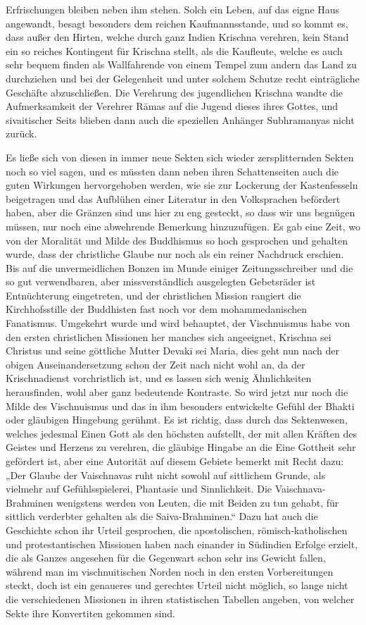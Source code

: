 \documentclass{article}
\begin{document}
Erfrischungen bleiben neben ihm stehen. Solch ein Leben, auf das eigne Haus angewandt, besagt besonders dem reichen Kaufmannsstande, und so kommt es, dass außer den Hirten, welche durch ganz Indien Krischna verehren, kein Stand ein so reiches Kontingent für Krischna stellt, als die Kaufleute, welche es auch sehr bequem finden als Wallfahrende von einem Tempel zum andern das Land zu durchziehen und bei der Gelegenheit und unter solchem Schutze recht einträgliche Geschäfte abzuschließen. Die Verehrung des jugendlichen Krischna wandte die Aufmerksamkeit der Verehrer R\={a}mas auf die Jugend dieses ihres Gottes, und sivaitischer Seits blieben dann auch die speziellen Anhänger Subhramanyas nicht zurück.

Es ließe sich von diesen in immer neue Sekten sich wieder zersplitternden Sekten noch so viel sagen, und es müssten dann neben ihren Schattenseiten auch die guten Wirkungen hervorgehoben werden, wie sie zur Lockerung der Kastenfesseln beigetragen und das Aufblühen einer Literatur in den Volksprachen befördert haben, aber die Gränzen sind uns hier zu eng gesteckt, so dass wir uns begnügen müssen, nur noch eine abwehrende Bemerkung hinzuzufügen. Es gab eine Zeit, wo von der Moralität und Milde des Buddhismus so hoch gesprochen und gehalten wurde, dass der christliche Glaube nur noch als ein reiner Nachdruck erschien. Bis auf die unvermeidlichen Bonzen im Munde einiger Zeitungsschreiber und die so gut verwendbaren, aber missverständlich ausgelegten Gebetsräder ist Entnüchterung eingetreten, und der christlichen Mission rangiert die Kirchhofsstille der Buddhisten fast noch vor dem mohammedanischen Fanatismus. Umgekehrt wurde und wird behauptet, der Vischnuismus habe von den ersten christlichen Missionen her manches sich angeeignet, Krischna sei Christus und seine göttliche Mutter Devak\={i} sei Maria, dies geht nun nach der obigen Auseinandersetzung schon der Zeit nach nicht wohl an, da der Krischnadienst vorchristlich ist, und es lassen sich wenig Ähnlichkeiten herausfinden, wohl aber ganz bedeutende Kontraste. So wird jetzt nur noch die Milde des Vischnuismus und das in ihm besonders entwickelte Gefühl der Bhakti oder gläubigen Hingebung gerühmt. Es ist richtig, dass durch das Sektenwesen, welches jedesmal Einen Gott als den höchsten aufstellt, der mit allen Kräften des Geistes und Herzens zu verehren, die gläubige Hingabe an die Eine Gottheit sehr gefördert ist, aber eine Autorität auf diesem Gebiete bemerkt mit Recht dazu: „Der Glaube der Vaischnavas ruht nicht sowohl auf sittlichem Grunde, als vielmehr auf Gefühlsspielerei, Phantasie und Sinnlichkeit. Die Vaischnava-Brahminen wenigstens werden von Leuten, die mit Beiden zu tun gehabt, für sittlich verderbter gehalten als die Saiva-Brahminen.“ Dazu hat auch die Geschichte schon ihr Urteil gesprochen, die apostolischen, römisch-katholischen und protestantischen Missionen haben nach einander in Südindien Erfolge erzielt, die als Ganzes angesehen für die Gegenwart schon sehr ins Gewicht fallen, während man im vischnuitischen Norden noch in den ersten Vorbereitungen steckt, doch ist ein genaueres und gerechtes Urteil nicht möglich, so lange nicht die verschiedenen Missionen in ihren statistischen Tabellen angeben, von welcher Sekte ihre Konvertiten gekommen sind.
\end{document}
